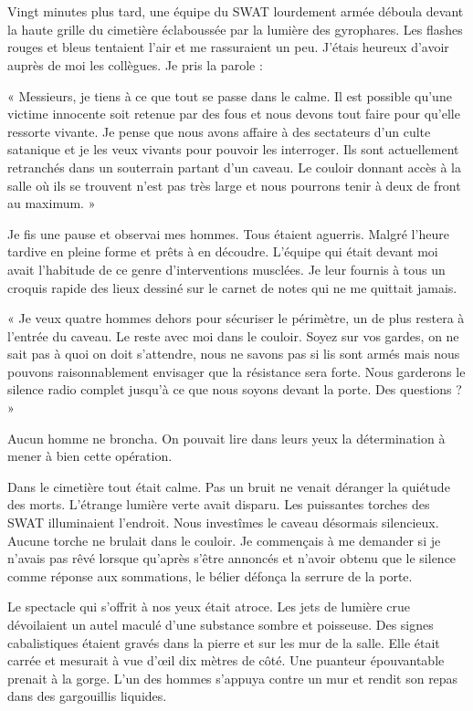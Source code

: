 \chapter{}
Vingt minutes plus tard, une équipe du SWAT lourdement armée déboula devant la haute grille du cimetière éclaboussée 
par la lumière des gyrophares. Les flashes rouges et bleus tentaient l'air et me rassuraient un peu. J'étais heureux 
d'avoir auprès de moi les collègues. Je pris la parole :

« Messieurs, je tiens à ce que tout se passe dans le calme. Il est possible qu'une victime innocente soit retenue par 
des fous et nous devons tout faire pour qu'elle ressorte vivante. Je pense que nous avons affaire à des sectateurs d'un 
culte satanique et je les veux vivants pour pouvoir les interroger. Ils sont actuellement retranchés dans un souterrain 
partant d'un caveau. Le couloir donnant accès à la salle où ils se trouvent n'est pas très large et nous pourrons tenir 
à deux de front au maximum. »

Je fis une pause et observai mes hommes. Tous étaient aguerris. Malgré l'heure tardive en pleine forme et prêts à en 
découdre. L'équipe qui était devant moi avait l'habitude de ce genre d'interventions musclées. Je leur fournis à tous 
un croquis rapide des lieux dessiné sur le carnet de notes qui ne me quittait jamais.

« Je veux quatre hommes dehors pour sécuriser le périmètre, un de plus restera à l'entrée du caveau. Le reste avec moi 
dans le couloir. Soyez sur vos gardes, on ne sait pas à quoi on doit s'attendre, nous ne savons pas si lis sont armés 
mais nous pouvons raisonnablement envisager que la résistance sera forte. Nous garderons le silence radio complet 
jusqu'à ce que nous soyons devant la porte. Des questions ? »

Aucun homme ne broncha. On pouvait lire dans leurs yeux la détermination à mener à bien cette opération.

Dans le cimetière tout était calme. Pas un bruit ne venait déranger la quiétude des morts. L'étrange lumière verte 
avait disparu. Les puissantes torches des SWAT illuminaient l'endroit. Nous investîmes le caveau désormais silencieux. 
Aucune torche ne brulait dans le couloir. Je commençais à me demander si je n'avais pas rêvé lorsque qu'après s'être 
annoncés et n'avoir obtenu que le silence comme réponse aux sommations, le bélier défonça la serrure de la porte.

Le spectacle qui s'offrit à nos yeux était atroce. Les jets de lumière crue dévoilaient un autel maculé d'une substance 
sombre et poisseuse. Des signes cabalistiques étaient gravés dans la pierre et sur les mur de la salle. Elle était 
carrée et mesurait à vue d'œil dix mètres de côté. Une puanteur épouvantable prenait à la gorge. L'un des hommes 
s'appuya contre un mur et rendit son repas dans des gargouillis liquides.

